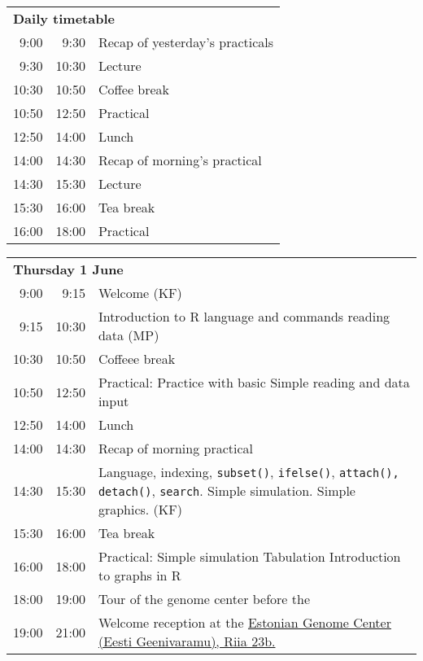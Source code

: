 \noindent
\begin{tabular}{r@{ -- }rp{13cm}}
\multicolumn{3}{l}{\bf Daily timetable} \\
 9:00 &  9:30 & Recap of yesterday's practicals \\
 9:30 & 10:30 & Lecture \\
10:30 & 10:50 & Coffee break \\
10:50 & 12:50 & Practical \\
12:50 & 14:00 & Lunch \\
14:00 & 14:30 & Recap of morning's practical \\
14:30 & 15:30 & Lecture \\
15:30 & 16:00 & Tea break \\
16:00 & 18:00 & Practical \\[2em]
\end{tabular}

\noindent
\begin{tabular}{r@{ -- }rp{12cm}}
\multicolumn{3}{l}{\bf Thursday 1 June} \\
 9:00 &  9:15 & Welcome (KF) \\
 9:15 & 10:30 & Introduction to R language and commands reading data (MP) \\
10:30 & 10:50 & Coffeee break \\
10:50 & 12:50 & Practical:
                Practice with basic \R \newline
                Simple reading and data input \\
12:50 & 14:00 & Lunch \\
14:00 & 14:30 & Recap of morning practical \\
14:30 & 15:30 & Language, indexing,
                {\tt subset()}, {\tt ifelse()},
                \texttt{attach(), detach()},
                \texttt{search}. Simple simulation. Simple graphics. (KF)\\
15:30 & 16:00 & Tea break\\
16:00 & 18:00 & Practical: Simple simulation \newline
                Tabulation\newline
                Introduction to graphs in R \\
18:00 & 19:00 & Tour of the genome center before the \\
19:00 & 21:00 & Welcome reception at the \newline
\href{https://www.google.dk/maps/place/Riia+23b,+51010+Tartu,+Estonia/@58.3728901,26.7157088,17z/data=!3m1!4b1!4m5!3m4!1s0x46eb371f8605d0f9:0x66688818ca0e3156!8m2!3d58.3728873!4d26.7178975?hl=en}%
{Estonian Genome Center (Eesti Geenivaramu), Riia 23b.}\\[1em]
\end{tabular}

